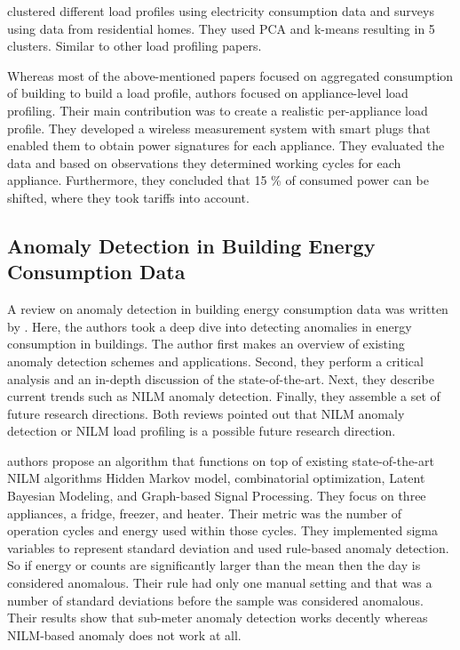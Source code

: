 \cite{Joana2012} clustered different load profiles using electricity consumption data and surveys using data from residential homes.
They used PCA and k-means resulting in 5 clusters. Similar to other load profiling papers. 

Whereas most of the above-mentioned papers focused on aggregated consumption of building to build a load profile,
authors \cite{Issi2018} focused on appliance-level load profiling.
Their main contribution was to create a realistic per-appliance load profile.
They developed a wireless measurement system with smart plugs that enabled them to obtain power signatures for each appliance. 
They evaluated the data and based on observations they determined working cycles for each appliance.
Furthermore, they concluded that 15 \% of consumed power can be shifted, where they took tariffs into account. 

\subsection{Anomaly Detection in Building Energy Consumption Data}

A review on anomaly detection in building energy consumption data was written by \cite{HIMEUR2021116601}.
Here, the authors took a deep dive into detecting anomalies in energy consumption in buildings. 
The author first makes an overview of existing anomaly detection schemes and applications.
Second, they perform a critical analysis and an in-depth discussion of the state-of-the-art.
Next, they describe current trends such as NILM anomaly detection. Finally, they assemble a set of future research directions. 
Both reviews pointed out that NILM anomaly detection or NILM load profiling is a possible future research direction.

\cite{NILMAD2019} authors propose an algorithm
that functions on top of existing state-of-the-art NILM algorithms Hidden Markov model,
combinatorial optimization, Latent Bayesian Modeling, and Graph-based Signal Processing.
They focus on three appliances, a fridge, freezer, and heater. Their metric was the number of operation cycles and energy used within those cycles. 
They implemented sigma variables to represent standard deviation and used rule-based anomaly detection.
So if energy or counts are significantly larger than the mean then the day is considered anomalous.
Their rule had only one manual setting and that was a number of standard deviations before the sample was considered anomalous.
Their results show that sub-meter anomaly detection works decently whereas NILM-based anomaly does not work at all. 

